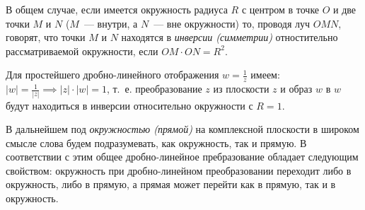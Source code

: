 \documentclass[../../main.tex]{subfiles}
\begin{document}
В общем случае, если имеется окружность радиуса $R$ с центром в точке $O$ и
две точки $M$ и $N$ ($M$~--- внутри, а $N$~--- вне окружности) то, проводя 
луч $OMN$, говорят, что точки $M$ и $N$ находятся в 
\emph{инверсии (симметрии)} отностительно
рассматриваемой окружности, если $OM \cdot ON = R^2$.

Для простейшего дробно-линейного отображения $ w = \frac{1}{z}$  имеем: 
$ |w| = \frac{1}{|z|} \implies {|z| \cdot |w| = 1}$, т.~е. преобразование $z$
из плоскости \textcircled{$z$}  и образ $w$ в  \textcircled{$w$} будут
находиться в инверсии относительно окружности с $R  = 1$.

\begin{center}
\end{center}
В дальнейшем под \emph{окружностью (прямой)} на комплексной плоскости в 
широком смысле слова будем
подразумевать, как окружность, так и прямую.
В соответствии с этим общее дробно-линейное пребразование обладает следующим
свойством: окружность при дробно-линейном преобразовании переходит либо
в окружность, либо в прямую, а прямая может перейти как
в прямую, так и в окружность.
\end{document}
